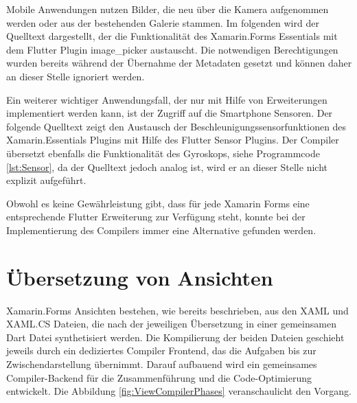 Mobile Anwendungen nutzen Bilder, die neu über die Kamera aufgenommen werden oder aus der bestehenden Galerie stammen.  Im folgenden wird der Quelltext dargestellt, der die Funktionalität des Xamarin.Forms Essentials mit dem Flutter Plugin \glq image\_picker\grq{} austauscht.  Die notwendigen Berechtigungen wurden bereits während der Übernahme der Metadaten gesetzt und können daher an dieser Stelle ignoriert werden.



Ein weiterer wichtiger Anwendungsfall,  der nur mit Hilfe von Erweiterungen implementiert werden kann,  ist der Zugriff auf die Smartphone Sensoren.  Der folgende Quelltext zeigt den Austausch der Beschleunigungssensorfunktionen des Xamarin.Essentials Plugins mit Hilfe des Flutter Sensor Plugins.  Der Compiler übersetzt ebenfalls die Funktionalität des Gyroskops, siehe Programmcode \ref{lst:Sensor},  da der Quelltext jedoch analog ist, wird er an dieser Stelle nicht explizit aufgeführt. 



 Obwohl es keine Gewährleistung gibt, dass für jede Xamarin Forms eine entsprechende Flutter 
Erweiterung zur Verfügung steht, konnte bei der Implementierung des Compilers immer eine  Alternative gefunden werden.


\section{Übersetzung von Ansichten}
Xamarin.Forms Ansichten bestehen, wie bereits beschrieben,  aus den XAML und XAML.CS Dateien, die nach der jeweiligen Übersetzung  in einer gemeinsamen Dart Datei synthetisiert werden.  
Die Kompilierung der beiden Dateien geschieht jeweils durch ein dediziertes Compiler Frontend, das die Aufgaben bis zur Zwischendarstellung übernimmt.  Darauf aufbauend wird ein gemeinsames Compiler-Backend für die Zusammenführung und die Code-Optimierung entwickelt.  Die Abbildung  \ref{fig:ViewCompilerPhases} veranschaulicht den Vorgang. 

